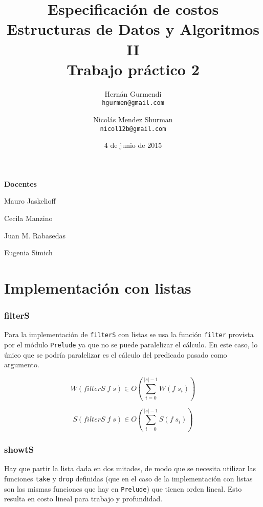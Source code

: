 \documentclass[a4paper,10pt]{article}
\author{
    Hernán Gurmendi \\
    \texttt{hgurmen@gmail.com}
    \and Nicolás Mendez Shurman \\
    \texttt{nicol12b@gmail.com}
}
\date{
    4 de junio de 2015
}
\title{
    \Huge Especificación de costos \\
    \Large Estructuras de Datos y Algoritmos II \\
    \large Trabajo práctico 2
}
\begin{document}
\maketitle

\begin{center}
\large \bf Docentes
\end{center}

\begin{center}
Mauro Jaskelioff

Cecila Manzino

Juan M. Rabasedas

Eugenia Simich
\end{center}

\newpage{}


\part*{Implementación con listas}


\section*{filterS}

Para la implementación de \texttt{filterS} con listas se usa la función
\texttt{filter} provista por el módulo \texttt{Prelude} ya que no se puede
paralelizar el cálculo. En este caso, lo único que se podría paralelizar es
el cálculo del predicado pasado como argumento.


\begin{equation*}
    W \left( filterS\; f \; s \right) \in
    O \left( \sum_{i=0}^{\vert s \vert -1} W(f \; s_i) \right)
\end{equation*}

\begin{equation*}
    S \left( filterS\; f \; s \right) \in
    O \left( \sum_{i=0}^{\vert s \vert -1} S(f \; s_i) \right)
\end{equation*}


\section*{showtS}

Hay que partir la lista dada en dos mitades, de modo que se necesita utilizar
las funciones \texttt{take} y \texttt{drop} definidas (que en el caso de la
implementación con listas son las mismas funciones que hay en \texttt{Prelude})
que tienen orden lineal. Esto resulta en costo lineal para trabajo y profundidad.
\end{document}
